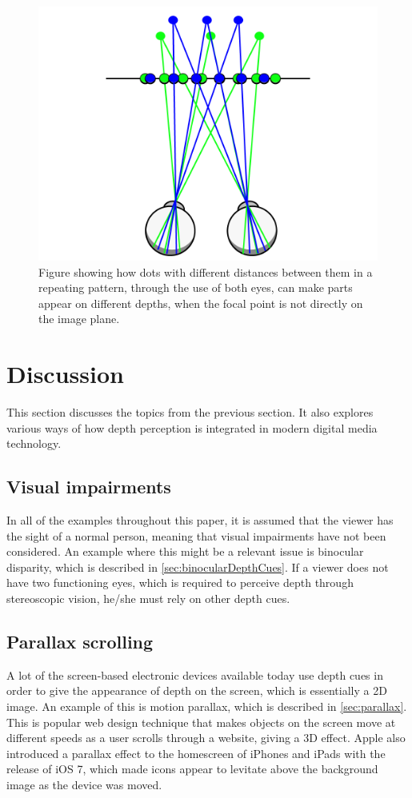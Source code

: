 \begin{figure}[H]
	\centering
	\includegraphics[width=0.9\linewidth]{figure/Analysis/autoStereogram.png}
	\caption{Figure showing how dots with different distances between them in a repeating pattern, through the use of both eyes, can make parts appear on different depths, when the focal point is not directly on the image plane.}
	\label{fig:autostereogram}
\end{figure}

\section{Discussion}
This section discusses the topics from the previous section. It also explores various ways of how depth perception is integrated in modern digital media technology.

	\subsection{Visual impairments}
	In all of the examples throughout this paper, it is assumed that the viewer has the sight of a normal person, meaning that visual impairments have not been considered. An example where this might be a relevant issue is binocular disparity, which is described in \autoref{sec:binocularDepthCues}. If a viewer does not have two functioning eyes, which is required to perceive depth through stereoscopic vision, he/she must rely on other depth cues.

	\subsection{Parallax scrolling}
	A lot of the screen-based electronic devices available today use depth cues in order to give the appearance of depth on the screen, which is essentially a 2D image. An example of this is motion parallax, which is described in \autoref{sec:parallax}. This is popular web design technique that makes objects on the screen move at different speeds as a user scrolls through a website, giving a 3D effect\citep{parallaxWeb}. Apple also introduced a parallax effect to the homescreen of iPhones and iPads with the release of iOS 7, which made icons appear to levitate above the background image as the device was moved\citep{ios7}.

